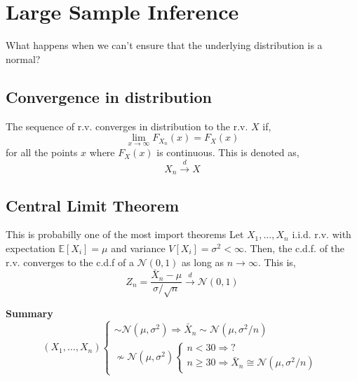 \section{Large Sample Inference}
What happens when we can't ensure that the underlying distribution is a normal?

\subsection{Convergence in distribution}
The sequence of r.v. converges in distribution to the r.v. $X$ if,
\[ \lim_{x\rightarrow\infty}F_{X_n}(x) = F_X(x) \] for all the points $x$ where
$F_X(x)$ is continuous. This is denoted as,
\[ X_n \xrightarrow{d} X \]  

\subsection{Central Limit Theorem}
This is probabilly one of the most import theorems Let $X_1,\dots,X_n$ i.i.d.
r.v. with expectation $\mathbb{E}[X_i] = \mu$ and variance $V[X_i]=\sigma^2 <
\infty$. Then, the c.d.f. of the r.v. converges to the c.d.f of a
$\mathcal{N}(0,1)$ as long as $n \rightarrow \infty$. This is,
\[ Z_n = \frac{\bar{X}_n - \mu}{\sigma/\sqrt{n}} \xrightarrow{d}
\mathcal{N}(0,1)\]


\textbf{Summary}\\
\[
(X_1,\dots,X_n)
\begin{cases}
    \sim \mathcal{N}(\mu, \sigma^2) \Rightarrow \bar{X}_n \sim \mathcal{N}(\mu, \sigma^2/n)\\
    \nsim \mathcal{N}(\mu, \sigma^2)
        \begin{cases}
            n < 30 \Rightarrow \text{?}\\
            n \geq 30 \Rightarrow \bar{X}_n \cong \mathcal{N}(\mu, \sigma^2/n)
        \end{cases}
\end{cases}
\]










